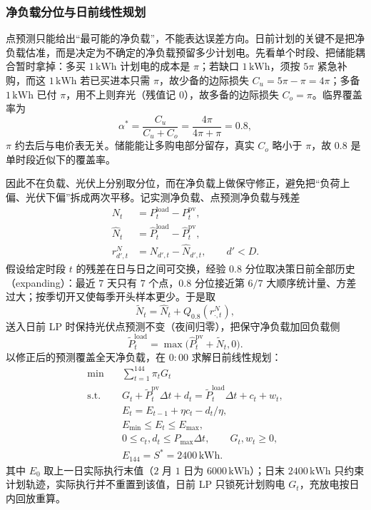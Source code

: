 \subsubsection{净负载分位与日前线性规划}

点预测只能给出“最可能的净负载”，不能表达误差方向。日前计划的关键不是把净负载估准，而是决定为不确定的净负载预留多少计划电。先看单个时段、把储能耦合暂时拿掉：多买 $1\,\mathrm{kWh}$ 计划电的成本是 $\pi$；若缺口 $1\,\mathrm{kWh}$，须按 $5\pi$ 紧急补购，而这 $1\,\mathrm{kWh}$ 若已买进本只需 $\pi$，故少备的边际损失 $C_u=5\pi-\pi=4\pi$；多备 $1\,\mathrm{kWh}$ 已付 $\pi$，用不上则弃光（残值记 $0$），故多备的边际损失 $C_o=\pi$。临界覆盖率为
\begin{equation}
\alpha^{*}=\frac{C_u}{C_u+C_o}=\frac{4\pi}{4\pi+\pi}=0.8,
\label{eq:q2_critical}
\end{equation}
$\pi$ 约去后与电价表无关。储能能让多购电部分留存，真实 $C_o$ 略小于 $\pi$，故 $0.8$ 是单时段近似下的覆盖率。

因此不在负载、光伏上分别取分位，而在净负载上做保守修正，避免把“负荷上偏、光伏下偏”拆成两次平移。记实测净负载、点预测净负载与残差
\begin{equation}
\begin{aligned}
N_t&=P^{\mathrm{load}}_{t}-P^{\mathrm{pv}}_{t},\\
\hat N_t&=\hat P^{\mathrm{load}}_{t}-\hat P^{\mathrm{pv}}_{t},\\
r^N_{d',t}&=N_{d',t}-\hat N_{d',t},\qquad d'<D.
\end{aligned}
\label{eq:q2_netdef}
\end{equation}
假设给定时段 $t$ 的残差在日与日之间可交换，经验 $0.8$ 分位取决策日前全部历史（expanding）：最近 $7$ 天只有 $7$ 个点，$0.8$ 分位接近第 $6/7$ 大顺序统计量、方差过大；按季切开又使每季开头样本更少。于是取
\begin{equation}
\tilde N_t=\hat N_t+Q_{0.8}(r^N_{\cdot,t}),
\label{eq:q2_net_quantile}
\end{equation}
送入日前 LP 时保持光伏点预测不变（夜间归零），把保守净负载加回负载侧
\begin{equation}
\tilde P^{\mathrm{load}}_{t}=\max\bigl(\hat P^{\mathrm{pv}}_{t}+\tilde N_t,0\bigr).
\label{eq:q2_load_back}
\end{equation}
以修正后的预测覆盖全天净负载，在 $0{:}00$ 求解日前线性规划：
\begin{equation}
\begin{aligned}
\min\quad &\sum_{t=1}^{144}\pi_t G_t \\
\mathrm{s.t.}\quad
&G_t+\tilde P^{\mathrm{pv}}_{t}\Delta t+d_t=\tilde P^{\mathrm{load}}_{t}\Delta t+c_t+w_t,\\
&E_t=E_{t-1}+\eta c_t-d_t/\eta,\\
&E_{\min}\le E_t\le E_{\max},\\
&0\le c_t,d_t\le P_{\max}\Delta t,\qquad G_t,w_t\ge0,\\
&E_{144}=S^{*}=2400\,\mathrm{kWh}.
\end{aligned}
\label{eq:q2_lp}
\end{equation}
其中 $E_0$ 取上一日实际执行末值（$2$ 月 $1$ 日为 $6000\,\mathrm{kWh}$）；日末 $2400\,\mathrm{kWh}$ 只约束计划轨迹，实际执行并不重置到该值，日前 LP 只锁死计划购电 $G_t$，充放电按日内回放重算。


